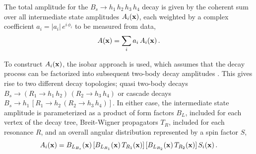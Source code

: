The total amplitude for the 
$B_s \to h_{1}\,h_{2}\,h_{3} \, h_{4}$
decay is given by the coherent sum over all 
intermediate state amplitudes $A_{i}(\mathbf{x} )$, each weighted by a complex coefficient $a_{i} = \vert a_{i} \vert \, e^{i \, \phi_i}$
to be measured from data,
\begin{equation}
	A(\mathbf{x} ) = \sum_{i}  a_{i} \, A_{i}(\mathbf{x} )   \, .
\end{equation}

To construct $A_{i}(\mathbf{x} )$,
the isobar approach is used, which 
assumes that
the decay process can be factorized into subsequent two-body decay amplitudes \cite{isobar1,isobar,isobar2}.
This gives rise to two different decay topologies;
quasi two-body decays
$B_s \to (R_{1} \to h_{1}\,h_{2}) \, (R_{2} \to h_{3}\,h_{4})$ 
or cascade decays
$B_s \to h_{1} \, \left[R_{1} \to h_{2} \,  (R_{2} \to h_{3} \, h_{4}) \right]$.
%
%
In either case, the intermediate state amplitude is parameterized as a product of
form factors $B_{L}$, included for each vertex of the decay tree, 
Breit-Wigner propagators $T_{R}$,  included for each resonance $R$,
and an overall angular distribution represented by a spin factor $S$,
\begin{equation}
	A_{i}(\mathbf{x} ) =  B_{L_{B_s}}(\bold x) \, [B_{L_{R_{1}}}(\mathbf{x} )  \, T_{R_{1}}(\mathbf{x} )] \, [B_{L_{R_{2}}}(\mathbf{x} ) \, T_{R_{2}}(\mathbf{x} )]  \,  S_{i}(\mathbf{x} )  \, .
	\label{eq:amp4}
\end{equation}

